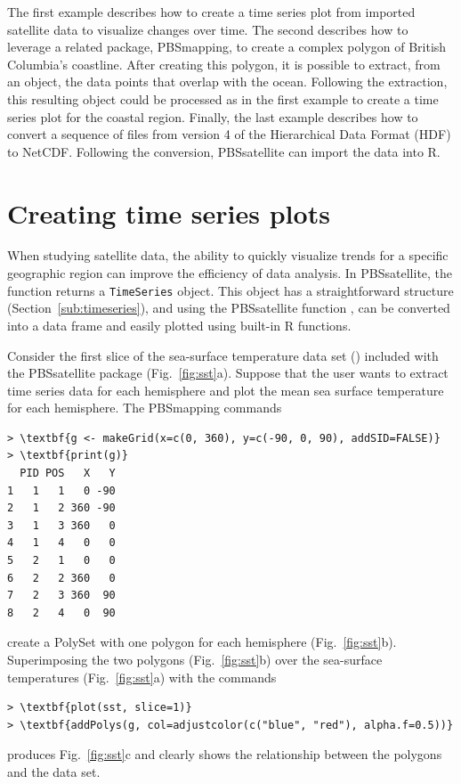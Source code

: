\documentclass[11pt]{report}
\begin{document}
The first example describes how to create a time series plot from imported satellite data to visualize changes over time.
The second describes how to leverage a related package, PBSmapping, to create a complex polygon of British Columbia's coastline.
After creating this polygon, it is possible to extract, from an  object, the data points that overlap with the ocean.
Following the extraction, this resulting  object could be processed as in the first example to create a time series plot for the coastal region. 
Finally, the last example describes how to convert a sequence of files from version 4 of the Hierarchical Data Format (HDF) to NetCDF.
Following the conversion, PBSsatellite can import the data into R.

\section{Creating time series plots}
\label{sec:creating_ts}

When studying satellite data, the ability to quickly visualize trends for a specific geographic region can improve the efficiency of data analysis.
In PBSsatellite, the  function returns a \lstinline{TimeSeries} object.
This object has a straightforward structure (Section~\ref{sub:timeseries}), and using the PBSsatellite function , can be converted into a data frame and easily plotted using built-in R functions.

Consider the first slice of the sea-surface temperature data set () included with the PBSsatellite package (Fig.~\ref{fig:sst}a).
Suppose that the user wants to extract time series data for each hemisphere and plot the mean sea surface temperature for each hemisphere.
The PBSmapping commands
\begin{Verbatim}[xleftmargin=.5in,commandchars=\\\{\},samepage=true]
> \textbf{g <- makeGrid(x=c(0, 360), y=c(-90, 0, 90), addSID=FALSE)}
> \textbf{print(g)}
  PID POS   X   Y
1   1   1   0 -90
2   1   2 360 -90
3   1   3 360   0
4   1   4   0   0
5   2   1   0   0
6   2   2 360   0
7   2   3 360  90
8   2   4   0  90
\end{Verbatim}
create a PolySet with one polygon for each hemisphere (Fig.~\ref{fig:sst}b).
Superimposing the two polygons (Fig.~\ref{fig:sst}b) over the sea-surface temperatures (Fig.~\ref{fig:sst}a) with the commands
\begin{Verbatim}[xleftmargin=.5in,commandchars=\\\{\},samepage=true]
> \textbf{plot(sst, slice=1)}
> \textbf{addPolys(g, col=adjustcolor(c("blue", "red"), alpha.f=0.5))}
\end{Verbatim}
produces Fig.~\ref{fig:sst}c and clearly shows the relationship between the polygons and the data set.
\end{document}
